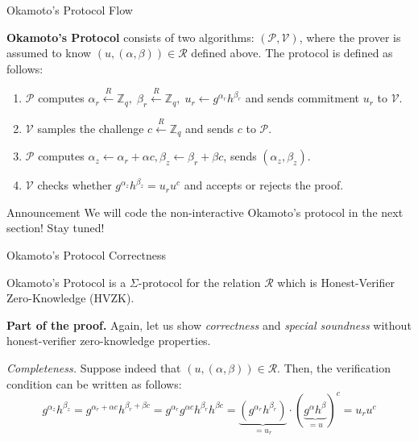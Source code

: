 \documentclass{zkdl-presentation-template}
\begin{document}
    \begin{frame}{Okamoto's Protocol Flow}
        \begin{definition}
            \textbf{Okamoto's Protocol} consists of two algorithms: $(\mathcal{P}, \mathcal{V})$, where the prover is assumed to know $(u,(\alpha,\beta)) \in \mathcal{R}$ defined above. The protocol is defined as follows:
            \begin{enumerate}
                \item $\mathcal{P}$ computes $\alpha_r \xleftarrow{R} \mathbb{Z}_q, \; \beta_r \xleftarrow{R} \mathbb{Z}_q, \; u_r \gets g^{\alpha_r}h^{\beta_r}$ and sends commitment $u_r$ to $\mathcal{V}$.
                \item $\mathcal{V}$ samples the challenge $c \xleftarrow{R} \mathbb{Z}_q$ and sends $c$ to $\mathcal{P}$.
                \item $\mathcal{P}$ computes $\alpha_z \gets \alpha_r + \alpha c, \beta_z \gets \beta_r + \beta c$, sends $(\alpha_z,\beta_z)$.
                \item $\mathcal{V}$ checks whether $g^{\alpha_z}h^{\beta_z} = u_r u^c$ and accepts or rejects the proof.
            \end{enumerate}
        \end{definition}

        \begin{alertblock}{Announcement}
            We will code the non-interactive Okamoto's protocol in the next section! Stay tuned!
        \end{alertblock}
    \end{frame}

    \begin{frame}{Okamoto's Protocol Correctness}
        \begin{theorem}
            Okamoto's Protocol is a $\Sigma$-protocol for the relation $\mathcal{R}$ which is Honest-Verifier Zero-Knowledge (HVZK).
        \end{theorem}
        
        \textbf{Part of the proof.} Again, let us show \textit{correctness} and \textit{special soundness} without honest-verifier zero-knowledge properties.
        
        \textit{Completeness.} Suppose indeed that $(u,(\alpha,\beta)) \in \mathcal{R}$. Then, the verification condition can be written as follows:
        \begin{equation*}
            g^{\alpha_z}h^{\beta_z} = g^{\alpha_r + \alpha c}h^{\beta_r + \beta c} = g^{\alpha_r}g^{\alpha c}h^{\beta_r}h^{\beta c} = \underbrace{(g^{\alpha_r}h^{\beta_r})}_{=u_r} \cdot (\underbrace{g^{\alpha}h^{\beta}}_{=u})^c = u_r u^c
        \end{equation*}
    \end{frame}
\end{document}
